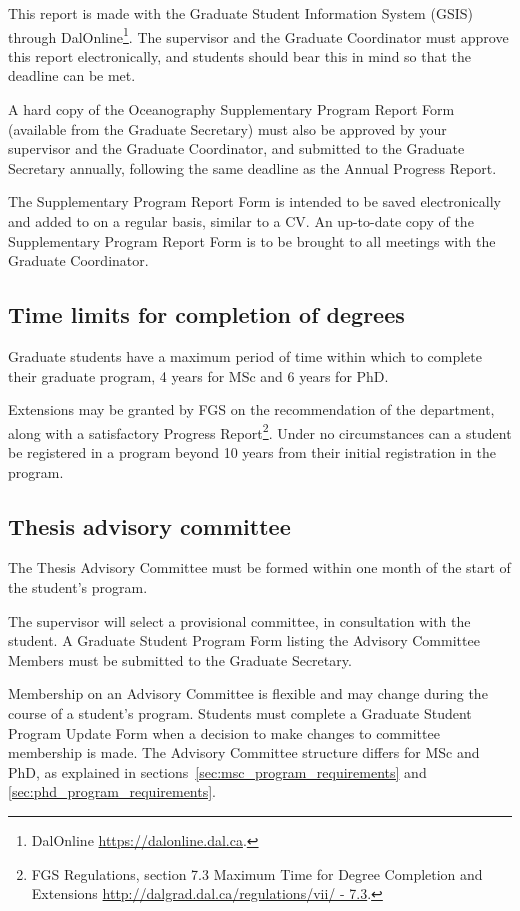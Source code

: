 \documentclass{article}
\newcommand\elink[1]{\url{#1}}
\begin{document}
This report is made with the Graduate Student Information System (GSIS) through
DalOnline\footnote{DalOnline \elink{https://dalonline.dal.ca}.}.  The
supervisor and the Graduate Coordinator must approve this report
electronically, and students should bear this in mind so that the deadline can
be met.

A hard copy of the Oceanography Supplementary Program Report Form (available
from the Graduate Secretary) must also be approved by your supervisor and the
Graduate Coordinator, and submitted to the Graduate Secretary annually,
following the same deadline as the Annual Progress Report.

The Supplementary Program Report Form is intended to be saved electronically
and added to on a regular basis, similar to a CV. An up-to-date copy of the
Supplementary Program Report Form is to be brought to all meetings with the
Graduate Coordinator.


\subsection{Time limits for completion of degrees}

Graduate students have a maximum period of time within which to complete their
graduate program, 4 years for MSc and 6 years for PhD.

Extensions may be granted by FGS on the recommendation of the department, along
with a satisfactory Progress Report\footnote{FGS Regulations, section 7.3
Maximum Time for Degree Completion and Extensions
\elink{http://dalgrad.dal.ca/regulations/vii/ - 7.3}.}.  Under no circumstances
can a student be registered in a program beyond 10 years from their initial
registration in the program.


\subsection{Thesis advisory committee}

The Thesis Advisory Committee must be formed within one month of the start of
the student’s program.

The supervisor will select a provisional committee, in consultation with the
student. A Graduate Student Program Form listing the Advisory Committee Members
must be submitted to the Graduate Secretary.

Membership on an Advisory Committee is flexible and may change during the
course of a student’s program. Students must complete a Graduate Student
Program Update Form when a decision to make changes to committee membership is
made. The Advisory Committee structure differs for MSc and PhD, as explained in
sections~\ref{sec:msc_program_requirements} and
\ref{sec:phd_program_requirements}.
\end{document}
